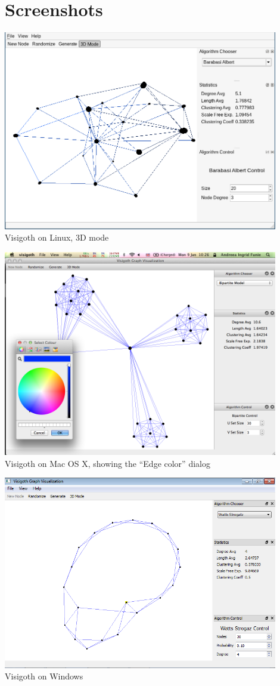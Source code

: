 \documentclass[a4paper,11pt,titlepage]{article}
\let\stdsection\section         %
\renewcommand{\section}{\newpage\stdsection}
\begin{document}
\appendix

\section{Screenshots}
\label{screenshots}

\begin{center}
  \includegraphics[width=0.9\textwidth]{screenshot-linux.png}
  Visigoth on Linux, 3D mode
  \bigskip

  \includegraphics[width=0.9\textwidth]{screenshot-mac.png}
  Visigoth on Mac OS X, showing the ``Edge color'' dialog
  \bigskip

  \includegraphics[width=0.9\textwidth]{screenshot-win.png}
  Visigoth on Windows
\end{center}
\end{document}
